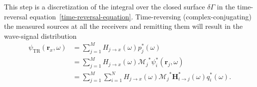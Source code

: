 This step is a discretization of the integral over the closed surface \(\delta \Gamma \) in the time-reversal equation~\eqref{time-reversal-equation}.
Time-reversing (complex-conjugating) the measured sources at all the receivers and remitting them will result in the wave-signal distribution
\begin{align}
    \psi_{\text{TR}}(\bm{r}_x, \omega)  &= \sum_{j=1}^{M} H_{j\rightarrow x}(\omega) p_j^*(\omega) \\
                                        &= \sum_{j=1}^{M} H_{j\rightarrow x}(\omega) {\mathcal{M}_j}^* \psi^*_i(\bm{r}_j, \omega) \\
                                        &= \sum_{j=1}^{M} \sum_{i=1}^{N} H_{j\rightarrow x}(\omega) {\mathcal{M}_j}^* \bm{H}^*_{i\rightarrow j}(\omega) q^*_i(\omega). \label{eq:signal-time-reversal}
\end{align}

